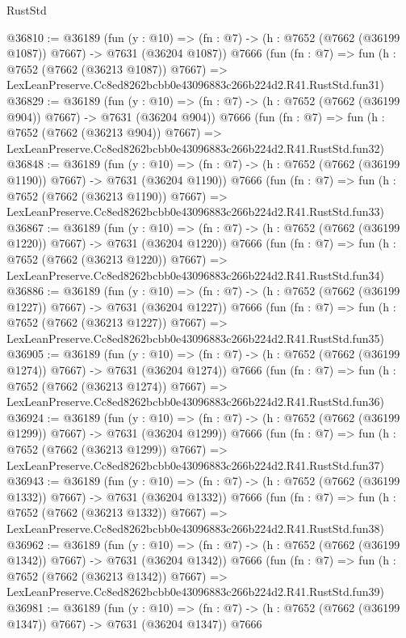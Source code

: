 \begin{lexlean}{RustStd}
\begin{coremodule}
@36810 := @36189
    (fun (y : @10) => (fn : @7) -> (h : @7652 (@7662 (@36199 @1087)) @7667) -> @7631 (@36204 @1087))
    @7666
    (fun (fn : @7) =>
    fun (h : @7652 (@7662 (@36213 @1087)) @7667) =>
    LexLeanPreserve.Cc8ed8262bcbb0e43096883c266b224d2.R41.RustStd.fun31)
@36829 := @36189
    (fun (y : @10) => (fn : @7) -> (h : @7652 (@7662 (@36199 @904)) @7667) -> @7631 (@36204 @904))
    @7666
    (fun (fn : @7) =>
    fun (h : @7652 (@7662 (@36213 @904)) @7667) =>
    LexLeanPreserve.Cc8ed8262bcbb0e43096883c266b224d2.R41.RustStd.fun32)
@36848 := @36189
    (fun (y : @10) => (fn : @7) -> (h : @7652 (@7662 (@36199 @1190)) @7667) -> @7631 (@36204 @1190))
    @7666
    (fun (fn : @7) =>
    fun (h : @7652 (@7662 (@36213 @1190)) @7667) =>
    LexLeanPreserve.Cc8ed8262bcbb0e43096883c266b224d2.R41.RustStd.fun33)
@36867 := @36189
    (fun (y : @10) => (fn : @7) -> (h : @7652 (@7662 (@36199 @1220)) @7667) -> @7631 (@36204 @1220))
    @7666
    (fun (fn : @7) =>
    fun (h : @7652 (@7662 (@36213 @1220)) @7667) =>
    LexLeanPreserve.Cc8ed8262bcbb0e43096883c266b224d2.R41.RustStd.fun34)
@36886 := @36189
    (fun (y : @10) => (fn : @7) -> (h : @7652 (@7662 (@36199 @1227)) @7667) -> @7631 (@36204 @1227))
    @7666
    (fun (fn : @7) =>
    fun (h : @7652 (@7662 (@36213 @1227)) @7667) =>
    LexLeanPreserve.Cc8ed8262bcbb0e43096883c266b224d2.R41.RustStd.fun35)
@36905 := @36189
    (fun (y : @10) => (fn : @7) -> (h : @7652 (@7662 (@36199 @1274)) @7667) -> @7631 (@36204 @1274))
    @7666
    (fun (fn : @7) =>
    fun (h : @7652 (@7662 (@36213 @1274)) @7667) =>
    LexLeanPreserve.Cc8ed8262bcbb0e43096883c266b224d2.R41.RustStd.fun36)
@36924 := @36189
    (fun (y : @10) => (fn : @7) -> (h : @7652 (@7662 (@36199 @1299)) @7667) -> @7631 (@36204 @1299))
    @7666
    (fun (fn : @7) =>
    fun (h : @7652 (@7662 (@36213 @1299)) @7667) =>
    LexLeanPreserve.Cc8ed8262bcbb0e43096883c266b224d2.R41.RustStd.fun37)
@36943 := @36189
    (fun (y : @10) => (fn : @7) -> (h : @7652 (@7662 (@36199 @1332)) @7667) -> @7631 (@36204 @1332))
    @7666
    (fun (fn : @7) =>
    fun (h : @7652 (@7662 (@36213 @1332)) @7667) =>
    LexLeanPreserve.Cc8ed8262bcbb0e43096883c266b224d2.R41.RustStd.fun38)
@36962 := @36189
    (fun (y : @10) => (fn : @7) -> (h : @7652 (@7662 (@36199 @1342)) @7667) -> @7631 (@36204 @1342))
    @7666
    (fun (fn : @7) =>
    fun (h : @7652 (@7662 (@36213 @1342)) @7667) =>
    LexLeanPreserve.Cc8ed8262bcbb0e43096883c266b224d2.R41.RustStd.fun39)
@36981 := @36189
    (fun (y : @10) => (fn : @7) -> (h : @7652 (@7662 (@36199 @1347)) @7667) -> @7631 (@36204 @1347))
    @7666

\end{coremodule}
\end{lexlean}
